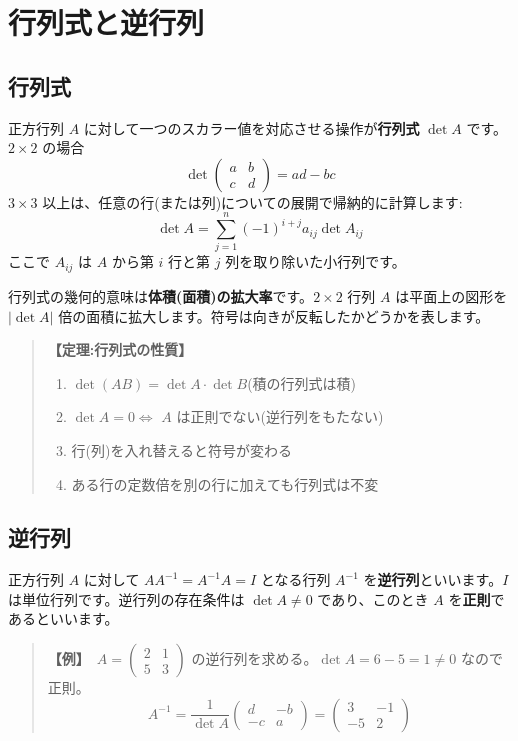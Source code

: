 \documentclass{article}
\begin{document}
\section{行列式と逆行列}

\subsection{行列式}

正方行列 \(A\) に対して一つのスカラー値を対応させる操作が\textbf{行列式} \(\det A\) です。\(2 \times 2\) の場合
\[ \det \begin{pmatrix} a & b \\ c & d \end{pmatrix} = ad - bc \]
\(3 \times 3\) 以上は、任意の行(または列)についての展開で帰納的に計算します:
\[ \det A = \sum_{j=1}^{n} (-1)^{i+j} a_{ij} \det A_{ij} \]
ここで \(A_{ij}\) は \(A\) から第 \(i\) 行と第 \(j\) 列を取り除いた小行列です。

行列式の幾何的意味は\textbf{体積(面積)の拡大率}です。\(2 \times 2\) 行列 \(A\) は平面上の図形を \(|\det A|\) 倍の面積に拡大します。符号は向きが反転したかどうかを表します。

\begin{quote}
\textbf{【定理:行列式の性質】}
\begin{enumerate}
\item \(\det(AB) = \det A \cdot \det B\)(積の行列式は積)
\item \(\det A = 0 \iff\) \(A\) は正則でない(逆行列をもたない)
\item 行(列)を入れ替えると符号が変わる
\item ある行の定数倍を別の行に加えても行列式は不変
\end{enumerate}
\end{quote}

\subsection{逆行列}

正方行列 \(A\) に対して \(AA^{-1} = A^{-1}A = I\) となる行列 \(A^{-1}\) を\textbf{逆行列}といいます。\(I\) は単位行列です。逆行列の存在条件は \(\det A \neq 0\) であり、このとき \(A\) を\textbf{正則}であるといいます。

\begin{quote}
\textbf{【例】}\ \(A = \begin{pmatrix} 2 & 1 \\ 5 & 3 \end{pmatrix}\) の逆行列を求める。\(\det A = 6 - 5 = 1 \neq 0\) なので正則。
\[ A^{-1} = \frac{1}{\det A} \begin{pmatrix} d & -b \\ -c & a \end{pmatrix} = \begin{pmatrix} 3 & -1 \\ -5 & 2 \end{pmatrix} \]
\end{quote}
\end{document}
